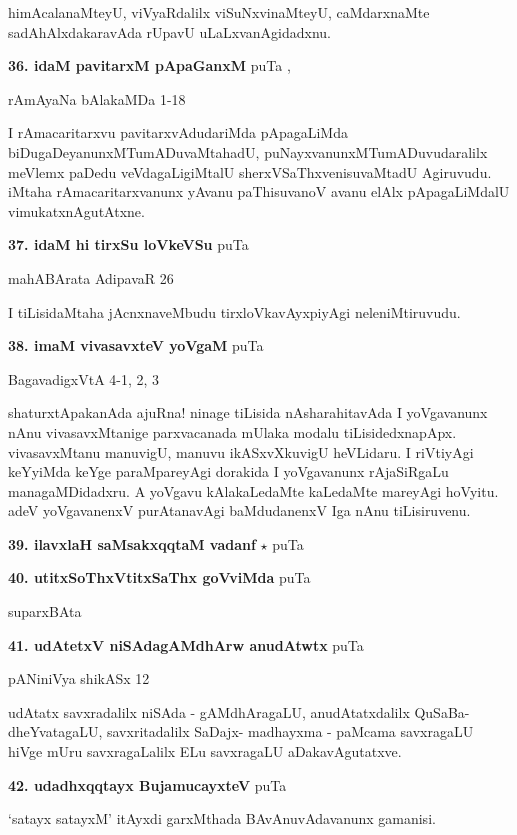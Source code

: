 himAcalanaMteyU, viVyaRdalilx viSuNxvinaMteyU, caMdarxnaMte sadAhAlxdakaravAda rUpavU uLaLxvanAgidadxnu.

\medskip
\noindent\textbf{36. idaM pavitarxM pApaGanxM} \hfill puTa \pageref{181},\pageref{211h}

\hfill rAmAyaNa bAlakaMDa 1-18

I rAmacaritarxvu pavitarxvAdudariMda pApagaLiMda biDugaDeyanunxMTumADuvaMtahadU, puNayxvanunxMTumADuvudaralilx meVlemx  paDedu veVdagaLigiMtalU sherxVSaThxvenisuvaMtadU Agiruvudu. iMtaha rAmacaritarxvanunx yAvanu paThisuvanoV avanu elAlx pApagaLiMdalU vimukatxnAgutAtxne. 

\medskip
\noindent\textbf{37. idaM hi tirxSu loVkeVSu} \hfill puTa \pageref{118a}

\hfill mahABArata AdipavaR 26

I tiLisidaMtaha jAcnxnaveMbudu tirxloVkavAyxpiyAgi neleniMtiruvudu. 

\medskip
\noindent\textbf{38. imaM vivasavxteV yoVgaM} \hfill puTa \pageref{90}

\hfill BagavadigxVtA 4-1, 2, 3

shaturxtApakanAda ajuRna! ninage tiLisida nAsharahitavAda I yoVgavanunx nAnu vivasavxMtanige parxvacanada mUlaka modalu tiLisidedxnapApx. vivasavxMtanu manuvigU, manuvu ikASxvXkuvigU heVLidaru. I riVtiyAgi keYyiMda keYge paraMpareyAgi dorakida I yoVgavanunx rAjaSiRgaLu managaMDidadxru. A yoVgavu kAlakaLedaMte kaLedaMte mareyAgi hoVyitu. adeV yoVgavanenxV purAtanavAgi baMdudanenxV Iga nAnu tiLisiruvenu.

\medskip
\noindent\textbf{39. ilavxlaH saMsakxqqtaM vadanf} $\star$ \hfill puTa \pageref{232a}

\medskip
\noindent\textbf{40. utitxSoThxVtitxSaThx goVviMda} \hfill puTa \pageref{147}

\hfill suparxBAta

\medskip
\noindent\textbf{41. udAtetxV niSAdagAMdhArw anudAtwtx} \hfill puTa \pageref{13}

\hfill pANiniVya shikASx 12

udAtatx savxradalilx niSAda - gAMdhAragaLU, anudAtatxdalilx QuSaBa-dheYvatagaLU, savxritadalilx SaDajx- madhayxma - paMcama savxragaLU hiVge mUru savxragaLalilx ELu savxragaLU aDakavAgutatxve.

\medskip
\noindent\textbf{42. udadhxqqtayx BujamucayxteV} \hfill puTa \pageref{130}

`satayx satayxM' itAyxdi garxMthada BAvAnuvAdavanunx gamanisi.

